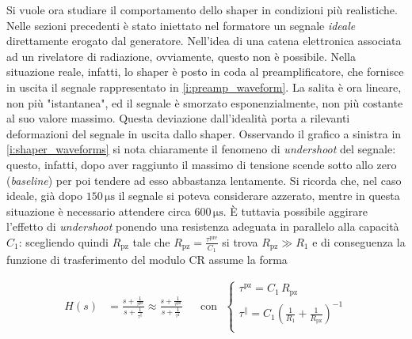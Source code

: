 \documentclass[a4paper,11pt]{article} %
\begin{document}
Si vuole ora studiare il comportamento dello shaper in condizioni più realistiche. Nelle sezioni precedenti
è stato iniettato nel formatore un segnale \textit{ideale} direttamente erogato dal generatore. Nell'idea di una catena
elettronica associata ad un rivelatore di radiazione, ovviamente, questo non è possibile. Nella situazione reale,
infatti, lo shaper è posto in coda al preamplificatore, che fornisce in uscita il segnale
rappresentato in \autoref{i:preamp_waveform}. La salita è ora lineare, non più "istantanea", ed il segnale è smorzato
esponenzialmente, non più costante al suo valore massimo. Questa deviazione dall'idealità porta a rilevanti deformazioni
del segnale in uscita dallo shaper. Osservando il grafico a sinistra in \autoref{i:shaper_waveforms} si nota
chiaramente il fenomeno di \textit{undershoot} del segnale: questo, infatti, dopo aver raggiunto il massimo di tensione
scende sotto allo zero (\textit{baseline}) per poi tendere ad esso abbastanza lentamente. Si ricorda che, nel caso
ideale, già dopo $150\,\si{\us}$ il segnale si poteva considerare azzerato, mentre in questa situazione è necessario
attendere circa $600\,\si{\us}$. È tuttavia possibile aggirare l'effetto di \textit{undershoot} ponendo una resistenza
adeguata in parallelo alla capacità $C_{1}$: scegliendo quindi $R_{\text{pz}}$ tale che $R_{\text{pz}} =
\frac{\tau^{\text{pre}}}{C_{1}}$ si trova $R_{\text{pz}} \gg R_{1}$ e di conseguenza la funzione di trasferimento del
modulo CR assume la forma

\begin{align} 
	H(s) &= \frac{s + \frac{ 1 }{ \tau^{ \text{pz} } }
		}
		{
		s + \frac{ 1 }{ \tau^{ \parallel } }
		} 
	\approx
	\frac{
		s + \frac{ 1 }{ \tau^{ \text{pz} } }
		}
		{
		s + \frac{ 1 }{ \tau^{ \text{1} } }
		} &
	&\text{con} \,\,\,\,    
	\begin{cases} \tau^{ \text{pz} } = C_{ 1 }\, R_{ \text{pz} }  \\
		\tau^{ \parallel } = C_{ 1 }\left(\frac{1}{R_{1}}+\frac{1}{R_{\text{pz}}}\right)^{-1}\\
	\end{cases} 
\end{align}
\end{document}
